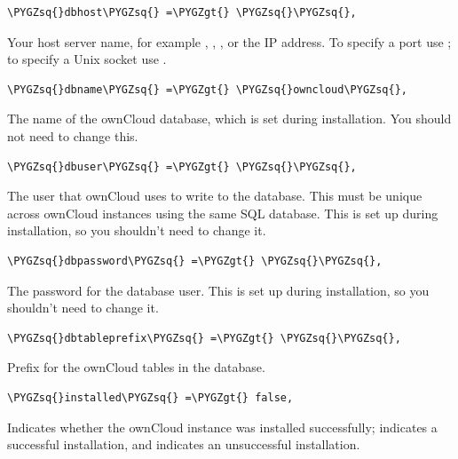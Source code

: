 \documentclass[letterpaper,10pt,english]{sphinxmanual}
\def\PYGZgt{\char`\>}
\def\PYGZsq{\char`\'}
\renewcommand\PYGZsq{\textquotesingle}
\begin{document}
\begin{Verbatim}[commandchars=\\\{\}]
\PYGZsq{}dbhost\PYGZsq{} =\PYGZgt{} \PYGZsq{}\PYGZsq{},
\end{Verbatim}

Your host server name, for example , ,
, or the IP address. To specify a port use
; to specify a Unix socket use
.

\begin{Verbatim}[commandchars=\\\{\}]
\PYGZsq{}dbname\PYGZsq{} =\PYGZgt{} \PYGZsq{}owncloud\PYGZsq{},
\end{Verbatim}

The name of the ownCloud database, which is set during installation. You
should not need to change this.

\begin{Verbatim}[commandchars=\\\{\}]
\PYGZsq{}dbuser\PYGZsq{} =\PYGZgt{} \PYGZsq{}\PYGZsq{},
\end{Verbatim}

The user that ownCloud uses to write to the database. This must be unique
across ownCloud instances using the same SQL database. This is set up during
installation, so you shouldn't need to change it.

\begin{Verbatim}[commandchars=\\\{\}]
\PYGZsq{}dbpassword\PYGZsq{} =\PYGZgt{} \PYGZsq{}\PYGZsq{},
\end{Verbatim}

The password for the database user. This is set up during installation, so
you shouldn't need to change it.

\begin{Verbatim}[commandchars=\\\{\}]
\PYGZsq{}dbtableprefix\PYGZsq{} =\PYGZgt{} \PYGZsq{}\PYGZsq{},
\end{Verbatim}

Prefix for the ownCloud tables in the database.

\begin{Verbatim}[commandchars=\\\{\}]
\PYGZsq{}installed\PYGZsq{} =\PYGZgt{} false,
\end{Verbatim}

Indicates whether the ownCloud instance was installed successfully; 
indicates a successful installation, and  indicates an unsuccessful
installation.
\end{document}
